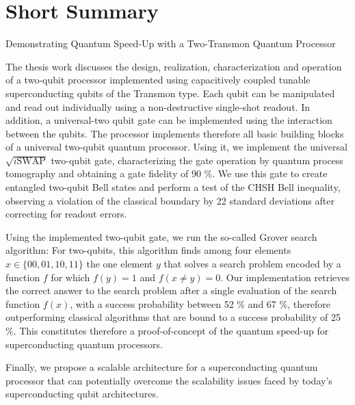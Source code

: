\documentclass[12pt,twoside]{book}
\theoremstyle{definition}
\begin{document}


\chapter*{Short Summary}

\begin{center}
{\huge Demonstrating Quantum Speed-Up with a Two-Transmon Quantum Processor} \\ \bigskip
\end{center}

The thesis work discusses the design, realization, characterization and operation of a two-qubit processor implemented using capacitively coupled tunable superconducting qubits of the Transmon type. Each qubit can be manipulated and read out individually using a non-destructive single-shot readout. In addition, a universal-two qubit gate can be implemented using the interaction between the qubits. The processor implements therefore all basic building blocks of a universal two-qubit quantum processor. Using it, we implement the universal $\sqrt{i\mathrm{SWAP}}$ two-qubit gate, characterizing the gate operation by quantum process tomography and obtaining a gate fidelity of 90 \%. We use this gate to create entangled two-qubit Bell states and perform a test of the CHSH Bell inequality, observing a violation of the classical boundary by 22 standard deviations after correcting for readout errors. 

\smallskip

Using the implemented two-qubit gate, we run the so-called Grover search algorithm: For two-qubits, this algorithm finds among four elements $x \in \{00,01,10,11\}$ the one element $y$ that solves a search problem encoded by a function $f$ for which $f(y)=1$ and $f(x\ne y)=0$. Our implementation retrieves the correct answer to the search problem after a single evaluation of the search function $f(x)$, with a success probability between 52 \% and 67 \%, therefore outperforming classical algorithms that are bound to a success probability of 25 \%. This constitutes therefore a proof-of-concept of the quantum speed-up for superconducting quantum processors.

\smallskip

Finally, we propose a scalable architecture for a superconducting quantum processor that can potentially overcome the scalability issues faced by today’s superconducting qubit architectures.
\end{document}
